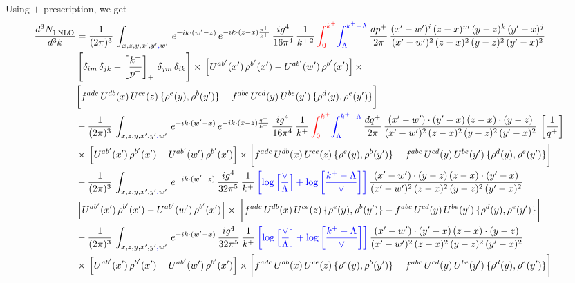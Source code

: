 \documentclass[9pt]{article}
\numberwithin{equation}{section}
\begin{document}
Using $+$ prescription, we get
\begin{align}
     \frac{d^{3}N_{1\,\rm NLO}^{\rm}}{d^{3}k}  & = \frac{1}{(2\pi)^{3}}\, \int_{x,z,y,x',y'{\color{blue},}w'}\,e^{-ik\cdot (w^\prime-z)}\,e^{-ik\cdot (z-x)\frac{p^{+}}{k^{+}}}\,\frac{ig^{4}}{16\pi^{4}}\, \frac{1}{k^{+\,2}}\,{\color{red}\int_{0}^{k^{+}}}{\color{blue}\int_{\Lambda}^{k^{+}-\Lambda}}\, \frac{dp^{+}}{2\pi}\,\frac{(x'-w')^{i}\,(z-x)^{m}\,(y-z)^{k}\,(y'-x)^{j}}{(x'-w')^{2}\,(z-x)^{2}\,(y-z)^{2}\,(y'-x)^{2}}\,\notag \\ & \left[\delta_{im}\,\delta_{jk}-\left[\frac{k^{+}}{p^{+}}\right]_{+}\, \delta_{jm}\,\delta_{ik}\right]\times\, \left[U^{ab'}(x')\,\rho^{b'}(x')-U^{ab'}(w')\,\rho^{b'}(x')\right]\times\notag \\ & \bigg[f^{adc}\,U^{db}(x)\,U^{ce}(z)\, \{\rho^{e}(y),\rho^{b}(y')\}-f^{abc}\,U^{cd}(y)\,U^{be}(y')\, \{\rho^{d}(y),\rho^{e}(y')\}\bigg]\notag \\ & -\frac{1}{(2\pi)^{3}}\, \int_{x,z,y,x',y'{\color{blue},}w'}\,e^{-ik\cdot (w^\prime-x)}\,e^{-ik\cdot (x-z)\frac{q^{+}}{k^{+}}}\,\frac{ig^{4}}{16\pi^{4}}\, \frac{1}{k^{+}}\,{\color{red}\int_{0}^{k^{+}}}{\color{blue}\int_{\Lambda}^{k^{+}-\Lambda}}\, \frac{dq^{+}}{2\pi}\,\frac{(x'-w')\cdot (y'-x)\,(z-x)\cdot (y-z)}{(x'-w')^{2}\,(z-x)^{2}\,(y-z)^{2}\,(y'-x)^{2}}\,\left[\frac{1}{q^{+}}\right]_{+}\notag \\ & \times\, \left[U^{ab'}(x')\,\rho^{b'}(x')-U^{ab'}(w')\,\rho^{b'}(x')\right]\times \bigg[f^{adc}\,U^{db}(x)\,U^{ce}(z)\, \{\rho^{e}(y),\rho^{b}(y')\}-f^{abc}\,U^{cd}(y)\,U^{be}(y')\, \{\rho^{d}(y),\rho^{e}(y')\}\bigg]\notag \\ & -\frac{1}{(2\pi)^{3}}\, \int_{x,z,y,x',y'{\color{blue},}w'}\,e^{-ik\cdot (w^\prime-z)}\,\frac{ig^{4}}{32\pi^{5}}\, \frac{1}{k^{+}}\,{\color{blue}\left[\log{\left[\frac{\vee}{\Lambda}\right]} + \log{\left[\frac{k^{+}-\Lambda}{\vee}\right]}\right]}\,\frac{(x'-w')\cdot (y-z)\,(z-x)\cdot (y'-x)}{(x'-w')^{2}\,(z-x)^{2}\,(y-z)^{2}\,(y'-x)^{2}}\,\notag \\ & \left[U^{ab'}(x')\,\rho^{b'}(x')-U^{ab'}(w')\,\rho^{b'}(x')\right]\times\, \bigg[f^{adc}\,U^{db}(x)\,U^{ce}(z)\, \{\rho^{e}(y),\rho^{b}(y')\}-f^{abc}\,U^{cd}(y)\,U^{be}(y')\, \{\rho^{d}(y),\rho^{e}(y')\}\bigg]\notag \\ &  -\frac{1}{(2\pi)^{3}}\, \int_{x,z,y,x',y'{\color{blue},}w'}\,e^{-ik\cdot (w^\prime-x)}\,\frac{ig^{4}}{32\pi^{5}}\, \frac{1}{k^{+}}\,{\color{blue}\left[\log{\left[\frac{\vee}{\Lambda}\right]} + \log{\left[\frac{k^{+}-\Lambda}{\vee}\right]}\right]}\,\frac{(x'-w')\cdot (y'-x)\,(z-x)\cdot (y-z)}{(x'-w')^{2}\,(z-x)^{2}\,(y-z)^{2}\,(y'-x)^{2}}\notag \\ & \times\, \left[U^{ab'}(x')\,\rho^{b'}(x')-U^{ab'}(w')\,\rho^{b'}(x')\right]\times \bigg[f^{adc}\,U^{db}(x)\,U^{ce}(z)\, \{\rho^{e}(y),\rho^{b}(y')\}-f^{abc}\,U^{cd}(y)\,U^{be}(y')\, \{\rho^{d}(y),\rho^{e}(y')\}\bigg]
\end{align}
\end{document}
